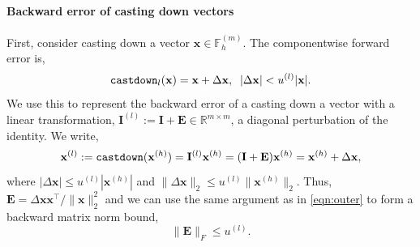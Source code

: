 \documentclass[review,onefignum,onetabnum]{siamart190516}
\newcommand{\R}{\mathbb{R}}
\newcommand{\F}{\mathbb{F}}
\newcommand{\bb}[1]{\mathbf{#1}}
\begin{document}
\paragraph{Backward error of casting down vectors} First, consider
casting down a vector  $\bb{x}\in\F_h^{(m)}$.
The componentwise forward error is, \[\text{\tt castdown}_{l}(\bb{x}) = \bb{x} + \Delta {\bb{x}},\;\; |\Delta\bb{x}| < u^{(l)}|\bb{x}|.\]
We use this to represent the backward error of a casting down a vector with a linear transformation, $\bb{I}^{(l)}:=\bb{I} +\bb{E}\in\R^{m\times m}$, a diagonal perturbation of the identity.
We write,
\begin{equation}
\bb{x}^{(l)} := \text{\tt castdown}(\bb{x}^{(h)}) = \bb{I}^{(l)}\bb{x}^{(h)} = (\bb{I}+\bb{E})\bb{x}^{(h)} = \bb{x}^{(h)}+\Delta \bb{x},
\end{equation}
where $|\Delta \bb{x}| \leq u^{(l)} |\bb{x}^{(h)}|$ and  $\|\Delta \bb{x}\|_2 \leq u^{(l)} \|\bb{x}^{(h)}\|_2$.
Thus, $\bb{E} = \Delta \bb{x x}^{\top}/\|\bb{x}\|_2^2$ and we can use the same argument as in \cref{eqn:outer} to form a backward matrix norm bound, 
\begin{equation}
\|\bb{E}\|_F\leq u^{(l)}. \label{eqn:castdown}
\end{equation}
\end{document}
